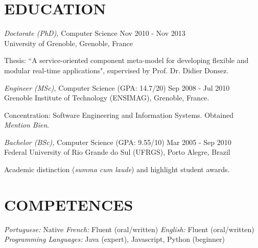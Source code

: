 \documentclass[margin]{res}
\begin{document}
\begin{resume}
		\section{EDUCATION} {\sl Doctorate (PhD),} Computer Science \hfill Nov 2010 - Nov 2013\\
               		University of Grenoble, Grenoble, France\\
	   		\begin{small}
        	        			{\color{darkgray} Thesis: ``A service-oriented component meta-model for developing flexible and modular real-time applications", supervised by Prof. Dr. Didier Donsez.}
				\vspace{1.5mm}\\                 	            
			\end{small}  	            
        		        {\sl Engineer (MSc),} Computer Science (GPA: 14.7/20) \hfill Sep 2008 - Jul 2010\\
               		Grenoble Institute of Technology (ENSIMAG), Grenoble, France.\\
	               	 \begin{small}
        		       		{\color{darkgray} Concentration: Software Engineering and Information Systems. Obtained \textit{Mention Bien}.}
				\vspace{1.5mm}\\
	               	\end{small}
        		        {\sl Bachelor (BSc),} Computer Science (GPA: 9.55/10) \hfill Mar 2005 - Sep 2010\\
                		Federal University of Rio Grande do Sul (UFRGS), Porto Alegre, Brazil\\
	               	\begin{small}
        		       		{\color{darkgray} Academic distinction (\textit{summa cum laude}) and highlight student awards.}
				\vspace{1.5mm}\\
	               	\end{small}
		\vspace{-8mm}
		\section{COMPETENCES} {\sl Portuguese:} Native \hfill {\sl French:} Fluent (oral/written) \hfill {\sl English:} Fluent (oral/written)\\
			{\sl Programming Languages:} Java (expert), Javascript, Python (beginner)\\
		\vspace{-6mm}

\end{resume}
\end{document}
